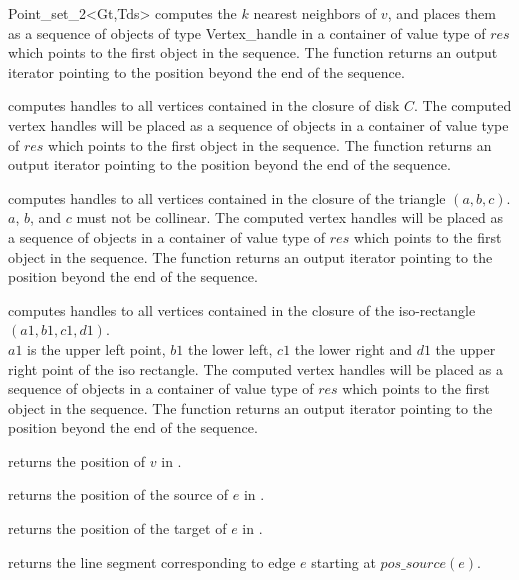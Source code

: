 \begin{ccRefClass}{Point_set_2<Gt,Tds>}
{ computes the $k$ nearest neighbors of $v$, and places them as a sequence of objects of type
Vertex\_handle in a container of value type of $res$
which points to the first object in the sequence. The function
returns an output iterator pointing to the position beyond the end
of the sequence. }

{ computes handles to all vertices contained in the closure of disk $C$.
The computed vertex handles will be placed as a sequence of objects in a container of value type
of $res$
which points to the first object in the sequence. The function
returns an output iterator pointing to the position beyond the end
of the sequence.
}

{ computes handles to all vertices contained in the closure of the triangle $(a,b,c)$.\\
\ccPrecond $a$, $b$, and $c$ must not be collinear. 
The computed vertex handles will be placed as a sequence of objects in a container of value type
of $res$
which points to the first object in the sequence. The function
returns an output iterator pointing to the position beyond the end
of the sequence.
}

{ computes handles to all vertices contained in the closure of the iso-rectangle $(a1,b1,c1,d1)$.\\
\ccPrecond $a1$ is the upper left point, $b1$ the lower left, $c1$ the lower
right and $d1$ the upper right point of the iso rectangle.
The computed vertex handles will be placed as a sequence of objects in a container of value type
of $res$
which points to the first object in the sequence. The function
returns an output iterator pointing to the position beyond the end
of the sequence.
}

{ returns the position of $v$ in \ccVar.}
    
{ returns the position of the source of $e$ in \ccVar.}
   
{ returns the position of the target of $e$ in \ccVar.}
    
{ returns the line segment corresponding to edge $e$ starting
at $pos\_source(e)$.}
   

\ccHtmlLinksOn

\end{ccRefClass} 
